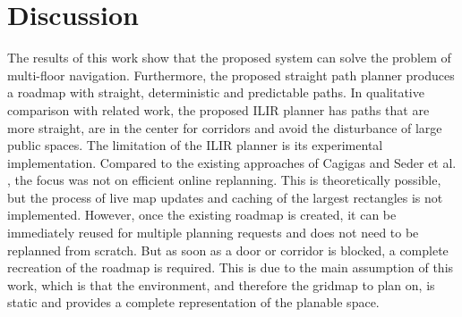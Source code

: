 \chapter{Discussion}
\label{sec:discussion}
The results of this work show that the proposed system can solve the problem of multi-floor navigation. Furthermore, the proposed straight path planner produces a roadmap with straight, deterministic and predictable paths. In qualitative comparison with related work, the proposed ILIR planner has paths that are more straight, are in the center for corridors and avoid the disturbance of large public spaces. The limitation of the ILIR planner is its experimental implementation. Compared to the existing approaches of Cagigas \cite{cagigas_hierarchical_2005} and Seder et al. \cite{seder_hierarchical_2011}, the focus was not on efficient online replanning. This is theoretically possible, but the process of live map updates and caching of the largest rectangles is not implemented. However, once the existing roadmap is created, it can be immediately reused for multiple planning requests and does not need to be replanned from scratch. But as soon as a door or corridor is blocked, a complete recreation of the roadmap is required. This is due to the main assumption of this work, which is that the environment, and therefore the gridmap to plan on, is static and provides a complete representation of the planable space. 

